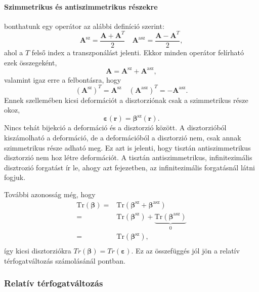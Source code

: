 \documentclass[12pt,a4paper]{scrartcl}
\let\mathbf\bm
\begin{document}
\paragraph{Szimmetrikus és antiszimmetrikus részekre} bonthatunk egy operátor az alábbi definíció szerint:
\[{{\mathbf{A}}^{{\text{sz}}}} = \frac{{{\mathbf{A}} + {{\mathbf{A}}^T}}}{2}\quad {{\mathbf{A}}^{\text{asz}}} = \frac{{{\mathbf{A}} - {{\mathbf{A}}^T}}}{2},\]
ahol a $T$ felső index a transzponálást jelenti. Ekkor minden operátor felírható ezek összegeként,
\[{\mathbf{A}} = {{\mathbf{A}}^{{\text{sz}}}} + {{\mathbf{A}}^{{\text{asz}}}},\]
valamint igaz erre a felbontásra, hogy \[{\left( {{{\mathbf{A}}^{{\text{sz}}}}} \right)^T} = {{\mathbf{A}}^{\text{sz}}}\quad {\left( {{{\mathbf{A}}^{{\text{asz}}}}} \right)^T} =  - {{\mathbf{A}}^{{\text{asz}}}}.\]
Ennek szellemében kicsi deformációt a disztorziónak csak a szimmetrikus része okoz,
\[{\mathbf{\varepsilon }}\left( {\mathbf{r}} \right) = {{\mathbf{\beta }}^{{\text{sz}}}}\left( {\mathbf{r}} \right).\]
Nincs tehát bijekció a deformáció és a disztorzió között. A disztorzióból kiszámolható a deformáció, de a deformációból a disztorzió nem, csak annak szimmetrikus része adható meg. Ez azt is jelenti, hogy tisztán antiszimmetrikus disztorzió nem hoz létre deformációt. A tisztán antiszimmetrikus, infinitezimális disztrozió forgatást ír le, ahogy azt  fejezetben, az infinitezimális forgatásnál látni fogjuk.

További azonosság még, hogy \[\begin{aligned}
  {\text{Tr}}\left( {\mathbf{\beta }} \right) =  & {\text{Tr}}\left( {{{\mathbf{\beta }}^{{\text{sz}}}} + {{\mathbf{\beta }}^{{\text{asz}}}}} \right) \\ 
   =  & {\text{Tr}}\left( {{{\mathbf{\beta }}^{{\text{sz}}}}} \right) + \underbrace {{\text{Tr}}\left( {{{\mathbf{\beta }}^{{\text{asz}}}}} \right)}_0 \\ 
   =  & {\text{Tr}}\left( {{{\mathbf{\beta }}^{{\text{sz}}}}} \right), \\ 
\end{aligned} \] így kicsi disztorziókra $Tr\left( {\mathbf{\beta }} \right) = Tr\left( {\mathbf{\varepsilon }} \right)$. Ez az összefüggés jól jön a relatív térfogatváltozás számolásánál  pontban.



\subsubsection{Relatív térfogatváltozás} \label{section:rel_volume}
\end{document}
